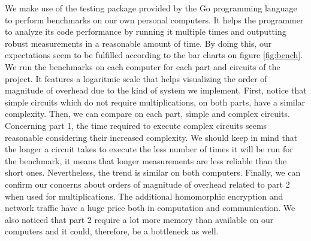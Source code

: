 \documentclass[10pt,conference]{IEEEtran}
\begin{document}
We make use of the testing package provided by the Go programming language to perform benchmarks on our own personal computers. It helps the programmer to analyze its code performance by running it multiple times and outputting robust measurements in a reasonable amount of time. By doing this, our expectations seem to be fulfilled according to the bar charts on figure \ref{fig:bench}. We run the benchmarks on each computer for each part and circuits of the project. It features a logaritmic scale that helps visualizing the order of magnitude of overhead due to the kind of system we implement. First, notice that simple circuits which do not require multiplications, on both parts, have a similar complexity. Then, we can compare on each part, simple and complex circuits. Concerning part 1, the time required to execute complex circuits seems reasonable considering their increased complexity. We should keep in mind that the longer a circuit takes to execute the less number of times it will be run for the benchmark, it means that longer measurements are less reliable than the short ones. Nevertheless, the trend is similar on both computers. Finally, we can confirm our concerns about orders of magnitude of overhead related to part 2 when used for multiplications. The additional homomorphic encryption and network traffic have a huge price both in computation and communication. We also noticed that part 2 require a lot more memory than available on our computers and it could, therefore, be a bottleneck as well.
\end{document}
